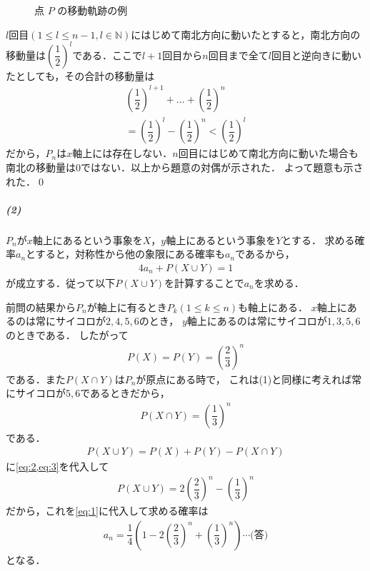 \documentclass[../../main.tex]{subfiles}
\begin{document}
\begin{figure}[htb]
  \caption{点 $P$ の移動軌跡の例}
  \label{fig:random_walk_axis_irreversibility}
\end{figure}

$l$回目$(1\le l\le n-1,l\in\mathbb{N})$にはじめて南北方向に動いたとすると，南北方向の移動量は$\left(\dfrac{1}{2}\right)^l$である．ここで$l+1$回目から$n$回目まで全て$l$回目と逆向きに動いたとしても，その合計の移動量は
\begin{align}
  \left(\dfrac{1}{2}\right)^{l+1}+ \dots+\left(\dfrac{1}{2}\right)^n \\
  =\left(\dfrac{1}{2}\right)^l-\left(\dfrac{1}{2}\right)^n<\left(\dfrac{1}{2}\right)^l
\end{align}
だから，$P_n$は$x$軸上には存在しない．$n$回目にはじめて南北方向に動いた場合も南北の移動量は$0$ではない．以上から題意の対偶が示された．
よって題意も示された．\qed

\subparagraph{(2)}

$P_n$が$x$軸上にあるという事象を$X$，$y$軸上にあるという事象を$Y$とする．
求める確率$a_n$とすると，対称性から他の象限にある確率も$a_n$であるから，
\begin{align}
  4a_n+P(X\cup Y)=1 \label{eq:1}
\end{align}
が成立する．従って以下$P(X\cup Y)$を計算することで$a_n$を求める．

前問の結果から$P_n$が軸上に有るとき$P_k(1\le k\le n)$も軸上にある．
$x$軸上にあるのは常にサイコロが$2,4,5,6$のとき，
$y$軸上にあるのは常にサイコロが$1,3,5,6$のときである．
したがって
\begin{align}
  P(X)=P(Y)=\left(\dfrac{2}{3}\right)^n  \label{eq:2}
\end{align}
である．また$P(X\cap Y)$は$P_n$が原点にある時で，
これは(1)と同様に考えれば常にサイコロが$5,6$であるときだから，
\begin{align}
  P(X\cap Y)=\left(\dfrac{1}{3}\right)^n \label{eq:3}
\end{align}
である．
\begin{align}
  P(X\cup Y)=P(X)+P(Y)-P(X\cap Y) \label{eq:4}
\end{align}
に\cref{eq:2,eq:3}を代入して
\begin{align}
  P(X\cup Y) = 2\left(\dfrac{2}{3}\right)^n - \left(\dfrac{1}{3}\right)^n
\end{align}
だから，これを\cref{eq:1}に代入して求める確率は
\begin{align}
  a_n
  =\dfrac{1}{4}\left(1-2\left(\dfrac{2}{3}\right)^n+\left(\dfrac{1}{3}\right)^n\right)\cdots\text{(答)}
\end{align}
となる．
\newpage
\end{document}
